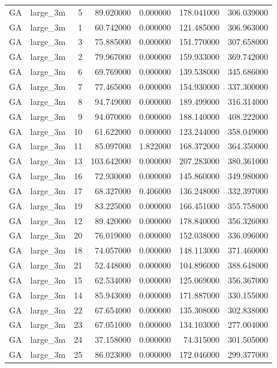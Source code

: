 \begin{tabular}{llrrrrr}
GA & large_3m & 5 & 89.020000 & 0.000000 & 178.041000 & 306.039000 \\
GA & large_3m & 1 & 60.742000 & 0.000000 & 121.485000 & 306.963000 \\
GA & large_3m & 3 & 75.885000 & 0.000000 & 151.770000 & 307.658000 \\
GA & large_3m & 2 & 79.967000 & 0.000000 & 159.933000 & 369.742000 \\
GA & large_3m & 6 & 69.769000 & 0.000000 & 139.538000 & 345.686000 \\
GA & large_3m & 7 & 77.465000 & 0.000000 & 154.930000 & 337.300000 \\
GA & large_3m & 8 & 94.749000 & 0.000000 & 189.499000 & 316.314000 \\
GA & large_3m & 9 & 94.070000 & 0.000000 & 188.140000 & 408.222000 \\
GA & large_3m & 10 & 61.622000 & 0.000000 & 123.244000 & 358.049000 \\
GA & large_3m & 11 & 85.097000 & 1.822000 & 168.372000 & 364.350000 \\
GA & large_3m & 13 & 103.642000 & 0.000000 & 207.283000 & 380.361000 \\
GA & large_3m & 16 & 72.930000 & 0.000000 & 145.860000 & 349.980000 \\
GA & large_3m & 17 & 68.327000 & 0.406000 & 136.248000 & 332.397000 \\
GA & large_3m & 19 & 83.225000 & 0.000000 & 166.451000 & 355.758000 \\
GA & large_3m & 12 & 89.420000 & 0.000000 & 178.840000 & 356.326000 \\
GA & large_3m & 20 & 76.019000 & 0.000000 & 152.038000 & 336.096000 \\
GA & large_3m & 18 & 74.057000 & 0.000000 & 148.113000 & 371.460000 \\
GA & large_3m & 21 & 52.448000 & 0.000000 & 104.896000 & 388.648000 \\
GA & large_3m & 15 & 62.534000 & 0.000000 & 125.069000 & 356.367000 \\
GA & large_3m & 14 & 85.943000 & 0.000000 & 171.887000 & 330.155000 \\
GA & large_3m & 22 & 67.654000 & 0.000000 & 135.308000 & 302.838000 \\
GA & large_3m & 23 & 67.051000 & 0.000000 & 134.103000 & 277.004000 \\
GA & large_3m & 24 & 37.158000 & 0.000000 & 74.315000 & 301.505000 \\
GA & large_3m & 25 & 86.023000 & 0.000000 & 172.046000 & 299.377000 \\

\end{tabular}
